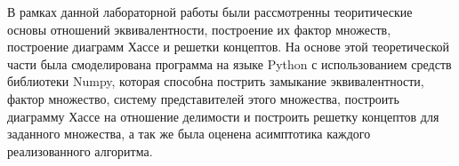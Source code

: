 \documentclass[spec, och, labwork]{shiza}
\begin{document}
В рамках данной лабораторной работы были рассмотренны теоритические основы  отношений эквивалентности, построение их фактор
множеств, построение диаграмм Хассе и решетки концептов. На основе этой теоретической части была смоделирована программа на языке Python с 
использованием средств библиотеки Numpy, которая способна пострить замыкание эквивалентности, фактор множество, систему представителей этого множества,
построить диаграмму Хассе на отношение делимости и построить решетку концептов для заданного множества, а так же была оценена асимптотика каждого реализованного
алгоритма.
\end{document}
